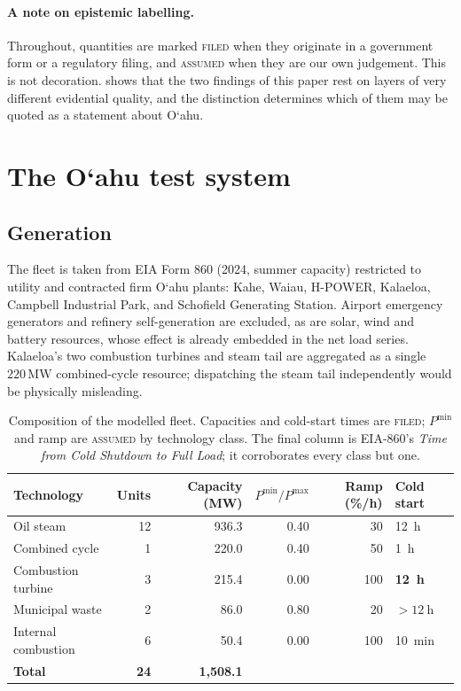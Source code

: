 \documentclass[11pt,a4paper]{article}
\theoremstyle{definition}
\theoremstyle{plain}
\theoremstyle{remark}
\newcommand{\MW}{\,\mathrm{MW}}
\newcommand{\okina}{\textquoteleft}
\newcommand{\Oahu}{O\okina ahu}
\newcommand{\Filed}{\textcolor{filed}{\textsc{filed}}}
\newcommand{\Assum}{\textcolor{assum}{\textsc{assumed}}}
\begin{document}
\paragraph{A note on epistemic labelling.}
Throughout, quantities are marked \Filed{} when they originate in a government
form or a regulatory filing, and \Assum{} when they are our own judgement. This
is not decoration.  shows that the two findings of this paper
rest on layers of very different evidential quality, and the distinction
determines which of them may be quoted as a statement about \Oahu{}.

\section{The \Oahu{} test system}
\label{sec:system}

\subsection{Generation}

The fleet is taken from EIA Form 860 (2024, summer capacity) restricted to
utility and contracted firm \Oahu{} plants: Kahe, Waiau, H-POWER, Kalaeloa,
Campbell Industrial Park, and Schofield Generating Station. Airport emergency
generators and refinery self-generation are excluded, as are solar, wind and
battery resources, whose effect is already embedded in the net load series.
Kalaeloa's two combustion turbines and steam tail are aggregated as a single
$220\MW$ combined-cycle resource; dispatching the steam tail independently
would be physically misleading.

\begin{table}[htbp]
\centering
\caption{Composition of the modelled fleet. Capacities and cold-start times are
\Filed{}; $P^{\min}$ and ramp are \Assum{} by technology class. The final column
is EIA-860's \emph{Time from Cold Shutdown to Full Load}; it corroborates every
class but one.}
\label{tab:fleet}
\small
\begin{tabular}{lrrrrl}
\toprule
Technology & Units & Capacity (\si{\mega\watt}) & $P^{\min}/P^{\max}$ & Ramp (\%/h) & Cold start \\
\midrule
Oil steam            & 12 & 936.3 & 0.40 & 30  & \SI{12}{\hour} \\
Combined cycle       &  1 & 220.0 & 0.40 & 50  & \SI{1}{\hour} \\
Combustion turbine   &  3 & 215.4 & 0.00 & 100 & \textbf{\SI{12}{\hour}} \\
Municipal waste      &  2 &  86.0 & 0.80 & 20  & $>\SI{12}{\hour}$ \\
Internal combustion  &  6 &  50.4 & 0.00 & 100 & \SI{10}{\minute} \\
\midrule
\textbf{Total}       & \textbf{24} & \textbf{1{,}508.1} & & & \\
\bottomrule
\end{tabular}
\end{table}
\end{document}
